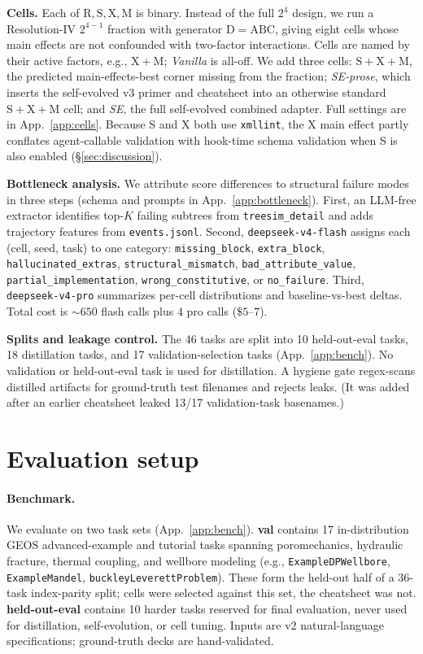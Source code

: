 \documentclass{article}
\begin{document}
\textbf{Cells.} Each of $\mathrm{R,S,X,M}$ is binary. Instead of the full $2^4$ design, we run a Resolution-IV $2^{4-1}$ fraction with generator $\mathrm{D}{=}\mathrm{ABC}$, giving eight cells whose main effects are not confounded with two-factor interactions. Cells are named by their active factors, e.g., $\mathrm{X+M}$; \emph{Vanilla} is all-off. We add three cells: $\mathrm{S+X+M}$, the predicted main-effects-best corner missing from the fraction; \emph{SE-prose}, which inserts the self-evolved v3 primer and cheatsheet into an otherwise standard $\mathrm{S+X+M}$ cell; and \emph{SE}, the full self-evolved combined adapter. Full settings are in App.~\ref{app:cells}. Because S and X both use \texttt{xmllint}, the X main effect partly conflates agent-callable validation with hook-time schema validation when S is also enabled (\S\ref{sec:discussion}).

\textbf{Bottleneck analysis.} We attribute score differences to structural failure modes in three steps (schema and prompts in App.~\ref{app:bottleneck}). First, an LLM-free extractor identifies top-$K$ failing subtrees from \texttt{treesim\_detail} and adds trajectory features from \texttt{events.jsonl}. Second, \texttt{deepseek-v4-flash} assigns each (cell, seed, task) to one category: \texttt{missing\_block}, \texttt{extra\_block}, \texttt{hallucinated\_extras}, \texttt{structural\_mismatch}, \texttt{bad\_attribute\_value}, \texttt{partial\_implementation}, \texttt{wrong\_constitutive}, or \texttt{no\_failure}. Third, \texttt{deepseek-v4-pro} summarizes per-cell distributions and baseline-vs-best deltas. Total cost is ${\sim}650$ flash calls plus 4 pro calls ($\$5\text{--}7$).

\textbf{Splits and leakage control.} The 46 tasks are split into 10 held-out-eval tasks, 18 distillation tasks, and 17 validation-selection tasks (App.~\ref{app:bench}). No validation or held-out-eval task is used for distillation. A hygiene gate regex-scans distilled artifacts for ground-truth test filenames and rejects leaks. (It was added after an earlier cheatsheet leaked 13/17 validation-task basenames.)

\section{Evaluation setup}
\label{sec:eval}

\paragraph{Benchmark.} We evaluate on two task sets (App.~\ref{app:bench}). \textbf{val} contains 17 in-distribution GEOS advanced-example and tutorial tasks spanning poromechanics, hydraulic fracture, thermal coupling, and wellbore modeling (e.g., \texttt{ExampleDPWellbore}, \texttt{ExampleMandel}, \texttt{buckleyLeverettProblem}). These form the held-out half of a 36-task index-parity split; cells were selected against this set, the cheatsheet was not. \textbf{held-out-eval} contains 10 harder tasks reserved for final evaluation, never used for distillation, self-evolution, or cell tuning. Inputs are v2 natural-language specifications; ground-truth decks are hand-validated.
\end{document}
